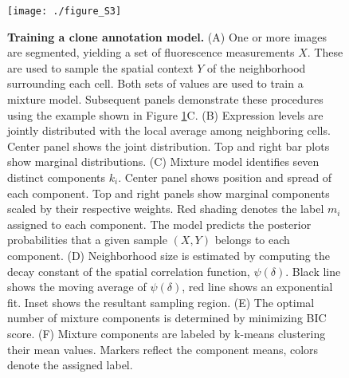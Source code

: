 \begin{figure}[h]
\texttt{[image: ./figure\_S3]}
\caption[Training a clone annotation model.]{\textbf{Training a clone annotation model.} (A) One or more images are segmented, yielding a set of fluorescence measurements $X$. These are used to sample the spatial context $Y$ of the neighborhood surrounding each cell. Both sets of values are used to train a mixture model. Subsequent panels demonstrate these procedures using the example shown in Figure \ref{fig:clones:figS3}C. (B) Expression levels are jointly distributed with the local average among neighboring cells. Center panel shows the joint distribution. Top and right bar plots show marginal distributions. (C) Mixture model identifies seven distinct components $k_i$. Center panel shows position and spread of each component. Top and right panels show marginal components scaled by their respective weights. Red shading denotes the label $m_i$ assigned to each component. The model predicts the posterior probabilities that a given sample $(X,Y)$ belongs to each component. (D) Neighborhood size is estimated by computing the decay constant of the spatial correlation function, $\psi(\delta)$. Black line shows the moving average of $\psi(\delta)$, red line shows an exponential fit. Inset shows the resultant sampling region. (E) The optimal number of mixture components is determined by minimizing BIC score. (F) Mixture components are labeled by k-means clustering their mean values. Markers reflect the component means, colors denote the assigned label.}
\label{fig:clones:figS3}
\end{figure}

